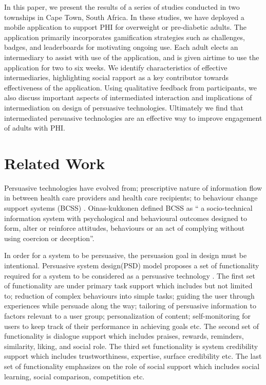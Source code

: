 \documentclass{sig-alternate}
\begin{document}
In this paper, we present the results of a series of studies conducted in two
townships in Cape Town, South Africa. In these studies, we have deployed a
mobile application to support PHI for overweight or pre-diabetic adults. The
application primarily incorporates gamification strategies such as challenges,
badges, and leaderboards for motivating ongoing use. Each adult elects an
intermediary to assist with use of the application, and is given airtime to
use the application for two to six weeks. We identify characteristics of
effective intermediaries, highlighting social rapport as a key contributor
towards effectiveness of the application. Using qualitative feedback from
participants, we also discuss important aspects of intermediated interaction
and implications of intermediation on design of persuasive technologies.
Ultimately we find that intermediated persuasive technologies are an effective
way to improve engagement of adults with PHI.

\section{Related Work} 

Persuasive technologies have evolved from; prescriptive
nature of information flow in between health care providers and health care
recipients\cite{chatterjee2009healthy}; to behaviour change support systems
(BCSS) \cite{langrial2012digital}. Oinas-kukkonen 
\cite{Oinas-Kukkonen:foundation} defined BCSS as `` a socio-technical information system
with psychological and behavioural outcomes designed to form, alter or
reinforce attitudes, behaviours or an act of complying without using coercion
or deception''.

In order for a system to be persuasive, the persuasion goal in design must be
intentional\cite{hamari2014persuasive}. Persuasive system design(PSD) model
proposes a set of functionality required for a system to be considered as a
persuasive technology \cite{Oinas-kukkonen:psd}. The first set of
functionality are under primary task support which includes but not limited
to; reduction of complex behaviours into simple tasks; guiding the user
through experiences while persuade along the way; tailoring of persuasive
information to factors relevant to a user group; personalization of content;
self-monitoring for users to keep track of their performance in  achieving
goals etc. The second set of functionality is dialogue support which includes
praises, rewards, reminders, similarity, liking, and social role. The third
set functionality is system credibility support which includes
trustworthiness, expertise, surface credibility etc. The last set of
functionality emphasizes on the role of social support which includes social
learning, social comparison, competition etc.
\end{document}
